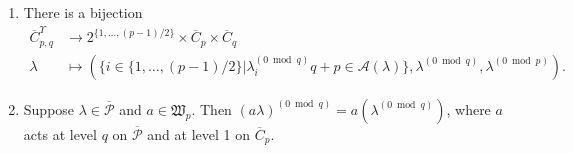 \documentclass[ALCO, Unicode,published]{cedram}
\newcommand*\nicefrac[2]{#1/#2}
\begin{document}
\begin{coro}
\begin{enumerate}
\item 
There is a bijection 
\begin{align*}\overline{C}^\Upsilon_{p,q}&\to2^{\{1,\dots,\nicefrac{(p-1)}{2}\}}\times\overline{C}_p\times\overline{C}_q\\
\lambda&\mapsto(\{i\in\{1,\dots,\nicefrac{(p-1)}{2}\}|\lambda^{(0\bmod q)}_iq+p\in\mathcal{A}(\lambda)\},\lambda^{(0\bmod q)},\lambda^{(0\bmod p)}). 
\end{align*}
\item Suppose $\lambda\in\overline{\mathcal{P}}$ and $a\in\mathfrak{W}_p$. Then $(a\lambda)^{(0\bmod q)}=a(\lambda^{(0\bmod q)})$, 
where $a$ acts at level $q$ on $\overline{\mathcal{P}}$ and at level 1 on $\overline{C}_p$. 
\end{enumerate}
\end{coro}
\end{document}
